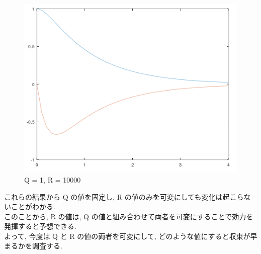\documentclass{jsarticle}
\begin{document}
\begin{figure}[h!]
\begin{minipage}{0.325\linewidth}
    \includegraphics[width=\linewidth]{./fig/q1_r10000.png}
    \caption{Q = 1, R = 10000}
  \end{minipage}
\end{figure}

これらの結果から Q の値を固定し, R の値のみを可変にしても変化は起こらないことがわかる.\\
\hspace*{1zw}このことから, R の値は, Q の値と組み合わせて両者を可変にすることで効力を発揮すると予想できる.\\

\vspace*{10mm}
よって, 今度は Q と R の値の両者を可変にして, どのような値にすると収束が早まるかを調査する.
\end{document}
